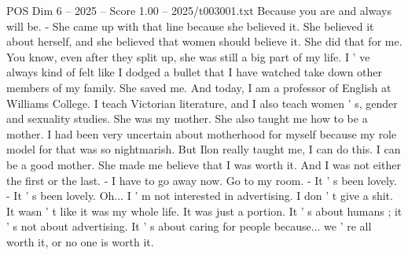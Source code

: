 \begin{textsample}{POS Dim 6 – 2025 – Score 1.00 – 2025/t003001.txt}
Because you are and always will be. - She came up with that line because she believed it.
She believed it about herself, and she believed that women should believe it.
She did that for me.
You know, even after they split up, she was still a big part of my life.
I ' ve always kind of felt like I dodged a bullet that I have watched take down other members of my family.
She saved me.
And today, I am a professor of English at Williams College.
I teach Victorian literature, and I also teach women ' s, gender and sexuality studies.
She was my mother.
She also taught me how to be a mother.
I had been very uncertain about motherhood for myself because my role model for that was so nightmarish.
But Ilon really taught me, I can do this.
I can be a good mother.
She made me believe that I was worth it.
And I was not either the first or the last. - I have to go away now.
Go to my room. - It ' s been lovely. - It ' s been lovely.
Oh...
I ' m not interested in advertising.
I don ' t give a shit.
It wasn ' t like it was my whole life.
It was just a portion.
It ' s about humans ; it ' s not about advertising.
It ' s about caring for people because... we ' re all worth it, or no one is worth it.

\end{textsample}
